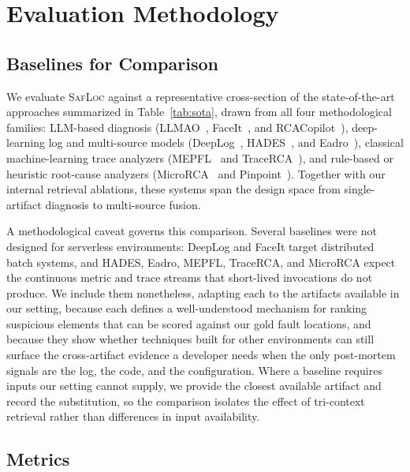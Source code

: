 \documentclass[runningheads]{llncs}
\begin{document}
\section{Evaluation Methodology}
\label{sec:evaluation}

\subsection{Baselines for Comparison}
\label{sec:baselines}

We evaluate \textsc{SafLoc} against a representative cross-section of the state-of-the-art approaches summarized in Table~\ref{tab:sota}, drawn from all four methodological families: LLM-based diagnosis (LLMAO~\cite{yang2024llmao}, FaceIt~\cite{shan2024faceit}, and RCACopilot~\cite{chen2024rcacopilot}), deep-learning log and multi-source models (DeepLog~\cite{du2017deeplog}, HADES~\cite{lee2023hades}, and Eadro~\cite{lee2023eadro}), classical machine-learning trace analyzers (MEPFL~\cite{zhou2019mepfl} and TraceRCA~\cite{li2021tracerca}), and rule-based or heuristic root-cause analyzers (MicroRCA~\cite{wu2020microrca} and Pinpoint~\cite{chen2002pinpoint}). Together with our internal retrieval ablations, these systems span the design space from single-artifact diagnosis to multi-source fusion.

A methodological caveat governs this comparison. Several baselines were not designed for serverless environments: DeepLog and FaceIt target distributed batch systems, and HADES, Eadro, MEPFL, TraceRCA, and MicroRCA expect the continuous metric and trace streams that short-lived invocations do not produce. We include them nonetheless, adapting each to the artifacts available in our setting, because each defines a well-understood mechanism for ranking suspicious elements that can be scored against our gold fault locations, and because they show whether techniques built for other environments can still surface the cross-artifact evidence a developer needs when the only post-mortem signals are the log, the code, and the configuration. Where a baseline requires inputs our setting cannot supply, we provide the closest available artifact and record the substitution, so the comparison isolates the effect of tri-context retrieval rather than differences in input availability.

\subsection{Metrics}
\end{document}
